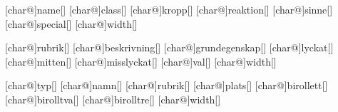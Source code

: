 \usepackage{xkeyval}

\makeatletter
{}[char@]{name}[]{}
[char@]{class}[]{}
[char@]{kropp}[]{}
[char@]{reaktion}[]{}
[char@]{sinne}[]{}
[char@]{special}[]{}
[char@]{width}[\linewidth]{}

[char@]{rubrik}[]{}
[char@]{beskrivning}[]{}
[char@]{grundegenskap}[]{}
[char@]{lyckat}[]{}
[char@]{mitten}[]{}
[char@]{misslyckat}[]{}
[char@]{val}[]{}
[char@]{width}[\linewidth]{}

[char@]{typ}[]{}
[char@]{namn}[]{}
[char@]{rubrik}[]{}
[char@]{plats}[]{}
[char@]{birollett}[]{}
[char@]{birolltva}[]{}
[char@]{birolltre}[]{}
[char@]{width}[\linewidth]{}

\newcommand{\statlabel}{\textsc}

\usepackage{calc,xparse}
\newlength\mycardwidth
\setlength{}
\NewDocumentCommand {}
\NewDocumentCommand {}
\NewDocumentCommand {}

